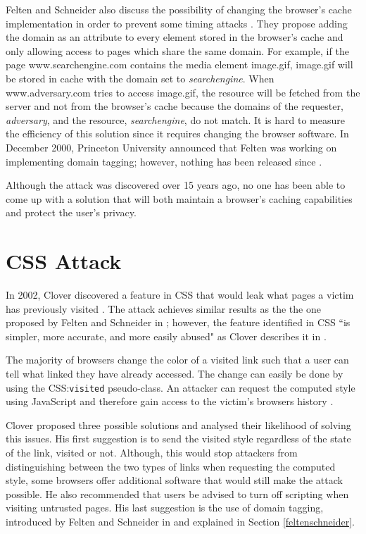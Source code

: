 \documentclass[10pt,a4paper,twoside]{book}
\begin{document}
Felten and Schneider also discuss the possibility of changing the browser's cache implementation in order to prevent some timing attacks \cite{felten2000timing}. They propose adding the domain as an attribute to every element stored in the browser's cache and only allowing access to pages which share the same domain. For example, if the page www.searchengine.com contains the media element image.gif, image.gif will be stored in cache with the domain set to \textit{searchengine}. When www.adversary.com tries to access image.gif, the resource will be fetched from the server and not from the browser's cache because the domains of the requester, \textit{adversary}, and the resource, \textit{searchengine}, do not match. It is hard to measure the efficiency of this solution since it requires changing the browser software. In December 2000, Princeton University announced that Felten was working on implementing domain tagging; however, nothing has been released since \cite{princetonunifelten}.

Although the attack was discovered over 15 years ago, no one has been able to come up with a solution that will both maintain a browser's caching capabilities and protect the user's privacy. 

\section{CSS Attack}
\label{cssatt}

In 2002, Clover discovered a feature in CSS that would leak what pages a victim has previously visited \cite{cssvisited}. The attack achieves similar results as the the one proposed by Felten and Schneider in \cite{felten2000timing}; however, the feature identified in CSS ``is simpler, more accurate, and more easily abused" as Clover describes it in \cite{cssvisited}.

The majority of browsers change the color of a visited link such that a user can tell what linked they have already accessed. The change can easily be done by using the CSS:\texttt{visited} pseudo-class. An attacker can request the computed style using JavaScript and therefore gain access to the victim's browsers history \cite{cssvisited}.

Clover proposed three possible solutions and analysed their likelihood of solving this issues. His first suggestion is to send the visited style regardless of the state of the link, visited or not. Although, this would stop attackers from distinguishing between the two types of links when requesting the computed style, some browsers offer additional software that would still make the attack possible. He also recommended that users be advised to turn off scripting when visiting untrusted pages. His last suggestion is the use of domain tagging, introduced by Felten and Schneider in \cite{felten2000timing} and explained in Section \ref{feltenschneider}.
\end{document}

